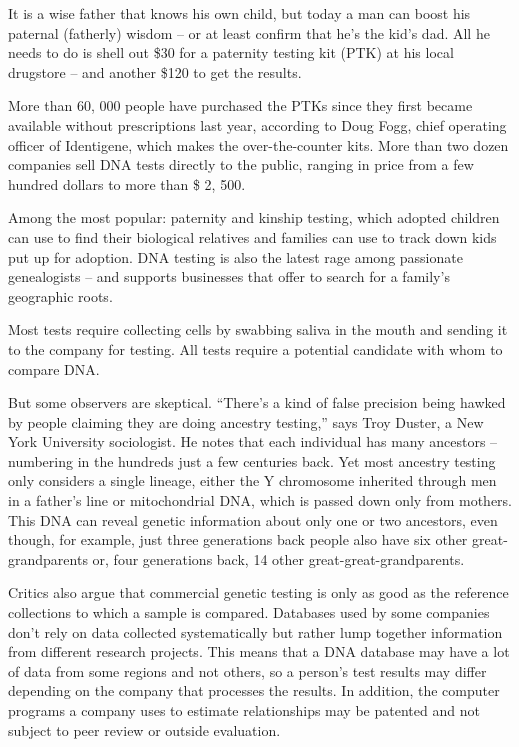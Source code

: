 It is a wise father that knows his own child, but today a man can boost his paternal (fatherly) wisdom – or at least confirm that he's the kid's dad. All he needs to do is shell out \$30 for a paternity testing kit (PTK) at his local drugstore – and another \$120 to get the results.


More than 60, 000 people have purchased the PTKs since they first became available without prescriptions last year, according to Doug Fogg, chief operating officer of Identigene, which makes the over-the-counter kits. More than two dozen companies sell DNA tests directly to the public, ranging in price from a few hundred dollars to more than \$ 2, 500.


Among the most popular: paternity and kinship testing, which adopted children can use to find their biological relatives and families can use to track down kids put up for adoption. DNA testing is also the latest rage among passionate genealogists – and supports businesses that offer to search for a family's geographic roots.


Most tests require collecting cells by swabbing saliva in the mouth and sending it to the company for testing. All tests require a potential candidate with whom to compare DNA.


But some observers are skeptical. ``There's a kind of false precision being hawked by people claiming they are doing ancestry testing,'' says Troy Duster, a New York University sociologist. He notes that each individual has many ancestors – numbering in the hundreds just a few centuries back. Yet most ancestry testing only considers a single lineage, either the Y chromosome inherited through men in a father's line or mitochondrial DNA, which is passed down only from mothers. This DNA can reveal genetic information about only one or two ancestors, even though, for example, just three generations back people also have six other great-grandparents or, four generations back, 14 other great-great-grandparents.


Critics also argue that commercial genetic testing is only as good as the reference collections to which a sample is compared. Databases used by some companies don't rely on data collected systematically but rather lump together information from different research projects. This means that a DNA database may have a lot of data from some regions and not others, so a person's test results may differ depending on the company that processes the results. In addition, the computer programs a company uses to estimate relationships may be patented and not subject to peer review or outside evaluation.